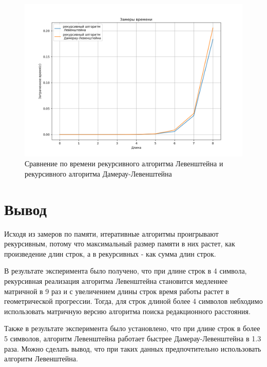 \begin{figure}[H]
	\begin{center}
		\includegraphics[scale=0.6]{img/third.png}
	\end{center}
	\captionsetup{justification=centering}
	\caption{Сравнение по времени рекурсивного алгоритма Левенштейна и рекурсивного алгоритма Дамерау-Левенштейна}
	\label{img:third}
\end{figure}

\section{Вывод}

Исходя из замеров по памяти, итеративные алгоритмы проигрывают рекурсивным, потому что максимальный размер памяти в них растет, как произведение длин строк, а в рекурсивных - как сумма длин строк.

В результате эксперимента было получено, что при длине строк в 4 символа, рекурсивная реализация алгоритма Левенштейна становится медленнее матричной в 9 раз и с увеличением длины строк время работы растет в геометрической прогрессии. Тогда, для строк длиной более 4 символов небходимо использовать матричную версию алгоритма поиска редакционного расстояния.

Также в результате эксперимента было установлено, что при длине строк в более 5 символов, алгоритм Левенштейна работает быстрее Дамерау-Левенштейна в 1.3 раза. Можно сделать вывод, что при таких данных предпочтительно использовать алгоритм Левенштейна.